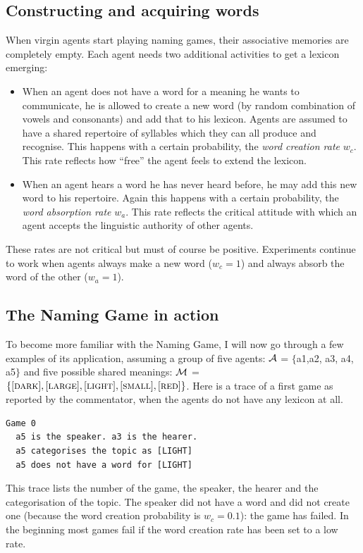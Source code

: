 \subsection{Constructing and acquiring words}

When virgin agents start playing naming games, their 
associative memories are completely empty. Each agent 
needs two additional activities to get a lexicon
emerging: 
\begin{itemize}
\item 
When an agent does not have a word for a
meaning he wants to communicate, he is allowed to create
a new word (by random combination of vowels and 
consonants) and add that to his 
lexicon. Agents are assumed to have a 
shared repertoire of syllables which they can all 
produce and recognise. This happens with a certain 
probability, the {\itshape word creation rate} $w_{c}$. 
This rate reflects how ``free'' the agent feels to 
extend the lexicon. 
\item 
When an agent hears a word he has 
never heard before, he may add this new word to his 
repertoire. Again this happens with a certain
probability, the {\itshape word absorption rate} $w_{a}$. 
This rate reflects the critical attitude with which an 
agent accepts the linguistic authority of other agents. 
\end{itemize}
These rates are not critical but must of course
be positive. Experiments continue to work 
when agents always make a new word ($w_{c}=1$) 
and always absorb the word of the other ($w_{a}=1$). 

\subsection{The Naming Game in action}
 
To become more familiar with the Naming Game, I will now 
go through a few examples of its application, assuming 
a group of five agents: ${\cal A}$ = $\{${\bfshape a1},{\bfshape a2},
{\bfshape a3}, {\bfshape a4}, {\bfshape a5}$\}$ and five possible shared meanings: 
${\cal M}$ = $\{[\textsc{dark}],[\textsc{large}],[\textsc{light}],[\textsc{small}],[\textsc{red}]\}$. 
\newline
Here is a trace of a first game as reported by 
the commentator, when the agents do not have any lexicon at
all. 
\begin{verbatim}
Game 0 
  a5 is the speaker. a3 is the hearer. 
  a5 categorises the topic as [LIGHT]
  a5 does not have a word for [LIGHT]
\end{verbatim}
This trace lists the number of the game, the speaker, the 
hearer and the categorisation of
the topic. The speaker did not have a word and did not 
create one (because the word creation probability is 
$w_{c}=0.1$): the game has failed. In the beginning 
most games fail if the word creation rate has been set to a low rate.

